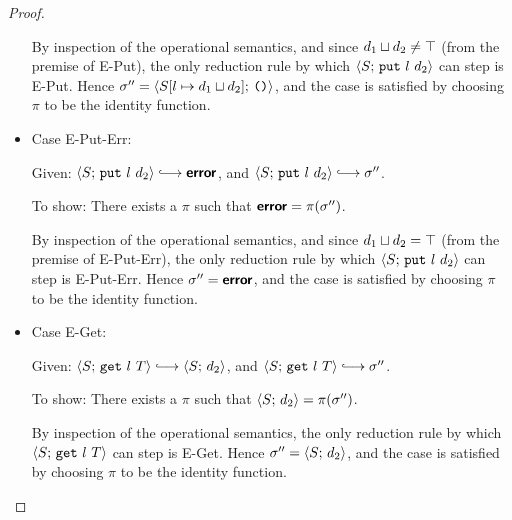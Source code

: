 \begin{proof}
\begin{itemize}
      By inspection of the operational semantics, and since
      $d_1 \sqcup d_2 \neq \top$ (from the premise of {\sc
      E-Put}), the only reduction rule by which
      $\langle S;\, \mbox{\texttt{put}}~l~d_2 \rangle$ can step is {\sc E-Put}.  Hence
      $\sigma'' = \langle S[l \mapsto d_1 \sqcup d_2];\, \mbox{\texttt{()}} \rangle$,
      and the case is satisfied by choosing $\pi$ to be the identity
      function.

      \item Case {\sc E-Put-Err}:

      Given: $\config{S}{\putexp{l}{d_2}} \parstepsto \error$, and
      $\config{S}{\putexp{l}{d_2}} \parstepsto \conf''$.

      To show: There exists a $\pi$ such that
      $\textbf{\textsf{error}} = \pi(\sigma'')$.

      By inspection of the operational semantics, and since
      $d_1 \sqcup d_2 = \top$ (from the premise of {\sc
      E-Put-Err}), the only reduction rule by which
      $\langle S;\, \mbox{\texttt{put}}~l~d_2 \rangle$ can step is {\sc E-Put-Err}.
      Hence $\sigma'' = \textbf{\textsf{error}}$, and the case is satisfied by choosing
      $\pi$ to be the identity function.

      \item Case {\sc E-Get}:

      Given: $\config{S}{\getexp{l}{T}} \parstepsto \config{S}{d_2}$,
      and $\config{S}{\getexp{l}{T}} \parstepsto \conf''$.

      To show: There exists a $\pi$ such that $\langle S;\, d_2 \rangle =
      \pi(\sigma'')$.

      By inspection of the operational semantics, the only reduction
      rule by which $\langle S;\, \mbox{\texttt{get}}~l~T \rangle$ can step is {\sc
        E-Get}.  Hence $\sigma'' = \langle S;\, d_2 \rangle$, and the case is
      satisfied by choosing $\pi$ to be the identity function.

  \end{itemize}
\end{proof}

